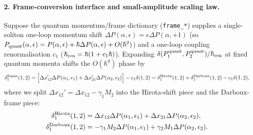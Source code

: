 \documentclass[11pt,a4paper]{article}
\theoremstyle{remark}
\begin{document}
\paragraph{2. Frame-conversion interface and small-amplitude scaling law.}
Suppose the quantum momentum/frame dictionary (\texttt{frame\_*}) supplies a single-soliton one-loop momentum shift $\Delta P(\alpha,\epsilon)=\epsilon\Delta P(\alpha,+1)$ (so $P_{\rm quant}(\alpha,\epsilon)=P(\alpha,\epsilon)+\hbar\Delta P(\alpha,\epsilon)+O(\hbar^2)$) and a one-loop coupling renormalisation $c_1$ ($\hbar_{\rm ren}=\hbar(1+c_1\hbar)$). Expanding $\delta(P_1^{\rm quant},P_2^{\rm quant})/\hbar_{\rm ren}$ at fixed quantum momenta shifts the $O(\hbar^0)$ phase by
\begin{equation}\label{eq:delta1_frame}
\delta_1^{\rm frame}(1,2)=\Bigl[\Delta x_{12}'\Delta P(\alpha_1,\epsilon_1)+\Delta x_{21}'\Delta P(\alpha_2,\epsilon_2)\Bigr]-c_1\delta(1,2)
=\delta_1^{\rm Hirota}(1,2)+\delta_1^{\rm Darboux}(1,2)-c_1\delta(1,2),
\end{equation}
where we split $\Delta x_{12}'=\Delta x_{12}-\gamma_1 M_2$ into the Hirota-shift piece and the Darboux-frame piece:
\begin{align}
\delta_1^{\rm Hirota}(1,2)&=\Delta x_{12}\Delta P(\alpha_1,\epsilon_1)+\Delta x_{21}\Delta P(\alpha_2,\epsilon_2),\label{eq:frame_split}\\
\delta_1^{\rm Darboux}(1,2)&=-\gamma_1 M_2\Delta P(\alpha_1,\epsilon_1)+\gamma_2 M_1\Delta P(\alpha_2,\epsilon_2).\nonumber
\end{align}
\end{document}
